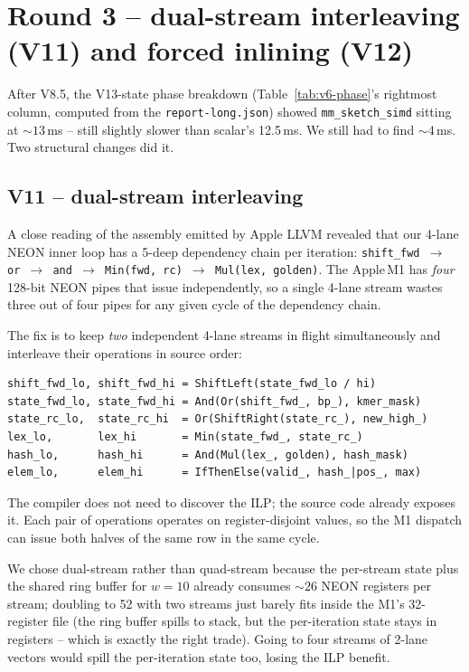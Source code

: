 \section{Round 3 -- dual-stream interleaving (V11) and forced inlining (V12)}
\label{sec:v11-v12}

After V8.5, the V13-state phase breakdown
(Table~\ref{tab:v6-phase}'s rightmost column, computed from the
\texttt{report-long.json}) showed
\texttt{mm\_sketch\_simd} sitting at $\sim 13$\,ms -- still
slightly slower than scalar's 12.5\,ms.  We still had to find
$\sim 4$\,ms.  Two structural changes did it.

\subsection{V11 -- dual-stream interleaving}

A close reading of the assembly emitted by Apple LLVM revealed that
our 4-lane NEON inner loop has a 5-deep dependency chain per
iteration: \texttt{shift\_fwd $\to$ or $\to$ and $\to$ Min(fwd, rc)
$\to$ Mul(lex, golden)}.  The Apple\,M1 has \emph{four} 128-bit NEON
pipes that issue independently, so a single 4-lane stream wastes
three out of four pipes for any given cycle of the dependency
chain.

The fix is to keep \emph{two} independent 4-lane streams in flight
simultaneously and interleave their operations in source order:

\begin{verbatim}
shift_fwd_lo, shift_fwd_hi = ShiftLeft(state_fwd_lo / hi)
state_fwd_lo, state_fwd_hi = And(Or(shift_fwd_, bp_), kmer_mask)
state_rc_lo,  state_rc_hi  = Or(ShiftRight(state_rc_), new_high_)
lex_lo,       lex_hi       = Min(state_fwd_, state_rc_)
hash_lo,      hash_hi      = And(Mul(lex_, golden), hash_mask)
elem_lo,      elem_hi      = IfThenElse(valid_, hash_|pos_, max)
\end{verbatim}

The compiler does not need to discover the ILP; the source code
already exposes it. Each pair of operations operates on
register-disjoint values, so the M1 dispatch can issue both halves of
the same row in the same cycle.

We chose dual-stream rather than quad-stream because the per-stream
state plus the shared ring buffer for $w=10$ already consumes
$\sim 26$ NEON registers per stream; doubling to 52 with two streams
just barely fits inside the M1's 32-register file (the ring buffer
spills to stack, but the per-iteration state stays in registers --
which is exactly the right trade).  Going to four streams of 2-lane
vectors would spill the per-iteration state too, losing the ILP
benefit.

